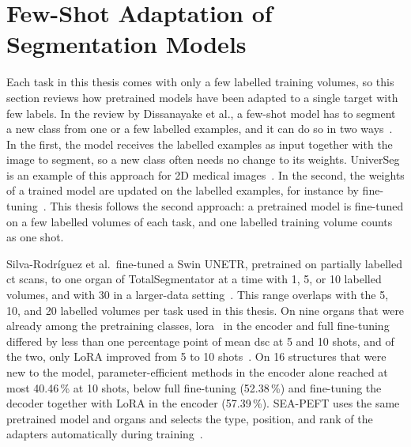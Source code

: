 \section{Few-Shot Adaptation of Segmentation Models}
\label{sec:sota-few-shot}

Each task in this thesis comes with only a few labelled training volumes, so this section reviews how pretrained models have been adapted to a single target with few labels.
In the review by Dissanayake et al., a few-shot model has to segment a new class from one or a few labelled examples, and it can do so in two ways~\cite[Sec.~2.2]{theekshana26fewshot}.
In the first, the model receives the labelled examples as input together with the image to segment, so a new class often needs no change to its weights.
UniverSeg is an example of this approach for 2D medical images~\cite{universeg}.
In the second, the weights of a trained model are updated on the labelled examples, for instance by fine-tuning~\cite[Sec.~2.2]{theekshana26fewshot}.
This thesis follows the second approach: a pretrained model is fine-tuned on a few labelled volumes of each task, and one labelled training volume counts as one shot.

Silva-Rodríguez et al.\ fine-tuned a Swin UNETR, pretrained on partially labelled \gls{ct} scans, to one organ of TotalSegmentator at a time with 1, 5, or 10 labelled volumes, and with 30 in a larger-data setting~\cite{silvarodriguez2023fseft}.
This range overlaps with the 5, 10, and 20 labelled volumes per task used in this thesis.
On nine organs that were already among the pretraining classes, \gls{lora}~\cite{hu2022lora} in the encoder and full fine-tuning differed by less than one percentage point of mean \gls{dsc} at 5 and 10 shots, and of the two, only LoRA improved from 5 to 10 shots~\cite{silvarodriguez2023fseft}.
On 16 structures that were new to the model, parameter-efficient methods in the encoder alone reached at most 40.46\,\% at 10 shots, below full fine-tuning (52.38\,\%) and fine-tuning the decoder together with LoRA in the encoder (57.39\,\%).
SEA-PEFT uses the same pretrained model and organs and selects the type, position, and rank of the adapters automatically during training~\cite{ly2026seapeft}.

